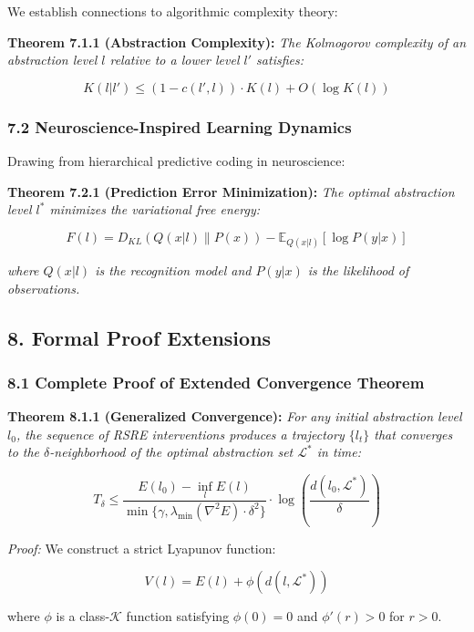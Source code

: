 \documentclass[
]{article}
\begin{document}
We establish connections to algorithmic complexity theory:

\textbf{Theorem 7.1.1 (Abstraction Complexity):} \emph{The Kolmogorov
complexity of an abstraction level \(l\) relative to a lower level
\(l'\) satisfies:}

\[K(l|l') \leq (1-c(l',l)) \cdot K(l) + O(\log K(l))\]

\subsubsection{7.2 Neuroscience-Inspired Learning
Dynamics}\label{neuroscience-inspired-learning-dynamics}

Drawing from hierarchical predictive coding in neuroscience:

\textbf{Theorem 7.2.1 (Prediction Error Minimization):} \emph{The
optimal abstraction level \(l^*\) minimizes the variational free
energy:}

\[F(l) = D_{KL}(Q(x|l) \| P(x)) - \mathbb{E}_{Q(x|l)}[\log P(y|x)]\]

\emph{where \(Q(x|l)\) is the recognition model and \(P(y|x)\) is the
likelihood of observations.}

\subsection{8. Formal Proof Extensions}\label{formal-proof-extensions}

\subsubsection{8.1 Complete Proof of Extended Convergence
Theorem}\label{complete-proof-of-extended-convergence-theorem}

\textbf{Theorem 8.1.1 (Generalized Convergence):} \emph{For any initial
abstraction level \(l_0\), the sequence of RSRE interventions produces a
trajectory \(\{l_t\}\) that converges to the \(\delta\)-neighborhood of
the optimal abstraction set \(\mathcal{L}^*\) in time:}

\[T_{\delta} \leq \frac{E(l_0) - \inf_{l} E(l)}{\min\{\gamma, \lambda_{\min}(\nabla^2 E) \cdot \delta^2\}} \cdot \log\left(\frac{d(l_0, \mathcal{L}^*)}{\delta}\right)\]

\emph{Proof:} We construct a strict Lyapunov function:

\[V(l) = E(l) + \phi(d(l, \mathcal{L}^*))\]

where \(\phi\) is a class-\(\mathcal{K}\) function satisfying
\(\phi(0) = 0\) and \(\phi'(r) > 0\) for \(r > 0\).
\end{document}
